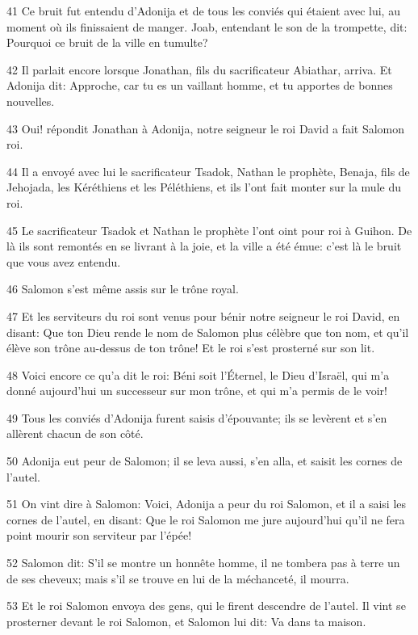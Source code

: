 \par 41 Ce bruit fut entendu d'Adonija et de tous les conviés qui étaient avec lui, au moment où ils finissaient de manger. Joab, entendant le son de la trompette, dit: Pourquoi ce bruit de la ville en tumulte?
\par 42 Il parlait encore lorsque Jonathan, fils du sacrificateur Abiathar, arriva. Et Adonija dit: Approche, car tu es un vaillant homme, et tu apportes de bonnes nouvelles.
\par 43 Oui! répondit Jonathan à Adonija, notre seigneur le roi David a fait Salomon roi.
\par 44 Il a envoyé avec lui le sacrificateur Tsadok, Nathan le prophète, Benaja, fils de Jehojada, les Kéréthiens et les Péléthiens, et ils l'ont fait monter sur la mule du roi.
\par 45 Le sacrificateur Tsadok et Nathan le prophète l'ont oint pour roi à Guihon. De là ils sont remontés en se livrant à la joie, et la ville a été émue: c'est là le bruit que vous avez entendu.
\par 46 Salomon s'est même assis sur le trône royal.
\par 47 Et les serviteurs du roi sont venus pour bénir notre seigneur le roi David, en disant: Que ton Dieu rende le nom de Salomon plus célèbre que ton nom, et qu'il élève son trône au-dessus de ton trône! Et le roi s'est prosterné sur son lit.
\par 48 Voici encore ce qu'a dit le roi: Béni soit l'Éternel, le Dieu d'Israël, qui m'a donné aujourd'hui un successeur sur mon trône, et qui m'a permis de le voir!
\par 49 Tous les conviés d'Adonija furent saisis d'épouvante; ils se levèrent et s'en allèrent chacun de son côté.
\par 50 Adonija eut peur de Salomon; il se leva aussi, s'en alla, et saisit les cornes de l'autel.
\par 51 On vint dire à Salomon: Voici, Adonija a peur du roi Salomon, et il a saisi les cornes de l'autel, en disant: Que le roi Salomon me jure aujourd'hui qu'il ne fera point mourir son serviteur par l'épée!
\par 52 Salomon dit: S'il se montre un honnête homme, il ne tombera pas à terre un de ses cheveux; mais s'il se trouve en lui de la méchanceté, il mourra.
\par 53 Et le roi Salomon envoya des gens, qui le firent descendre de l'autel. Il vint se prosterner devant le roi Salomon, et Salomon lui dit: Va dans ta maison.

